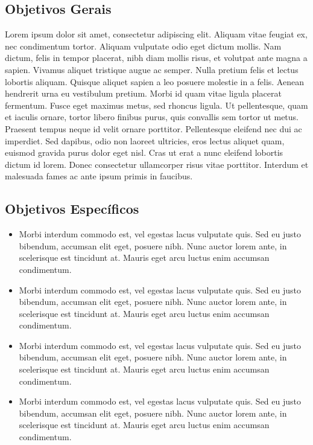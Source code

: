 \subsection{Objetivos Gerais}
Lorem ipsum dolor sit amet, consectetur adipiscing elit. Aliquam vitae feugiat ex, nec condimentum tortor. Aliquam vulputate odio eget dictum mollis. Nam dictum, felis in tempor placerat, nibh diam mollis risus, et volutpat ante magna a sapien. Vivamus aliquet tristique augue ac semper. Nulla pretium felis et lectus lobortis aliquam. Quisque aliquet sapien a leo posuere molestie in a felis. Aenean hendrerit urna eu vestibulum pretium. Morbi id quam vitae ligula placerat fermentum. Fusce eget maximus metus, sed rhoncus ligula. Ut pellentesque, quam et iaculis ornare, tortor libero finibus purus, quis convallis sem tortor ut metus. Praesent tempus neque id velit ornare porttitor. Pellentesque eleifend nec dui ac imperdiet. Sed dapibus, odio non laoreet ultricies, eros lectus aliquet quam, euismod gravida purus dolor eget nisl. Cras ut erat a nunc eleifend lobortis dictum id lorem. Donec consectetur ullamcorper risus vitae porttitor. Interdum et malesuada fames ac ante ipsum primis in faucibus.

\subsection{Objetivos Específicos}

\begin{itemize}
    \item Morbi interdum commodo est, vel egestas lacus vulputate quis. Sed eu justo bibendum, accumsan elit eget, posuere nibh. Nunc auctor lorem ante, in scelerisque est tincidunt at. Mauris eget arcu luctus enim accumsan condimentum. 
    \item Morbi interdum commodo est, vel egestas lacus vulputate quis. Sed eu justo bibendum, accumsan elit eget, posuere nibh. Nunc auctor lorem ante, in scelerisque est tincidunt at. Mauris eget arcu luctus enim accumsan condimentum. 
    \item Morbi interdum commodo est, vel egestas lacus vulputate quis. Sed eu justo bibendum, accumsan elit eget, posuere nibh. Nunc auctor lorem ante, in scelerisque est tincidunt at. Mauris eget arcu luctus enim accumsan condimentum. 
     \item Morbi interdum commodo est, vel egestas lacus vulputate quis. Sed eu justo bibendum, accumsan elit eget, posuere nibh. Nunc auctor lorem ante, in scelerisque est tincidunt at. Mauris eget arcu luctus enim accumsan condimentum. 
\end{itemize}